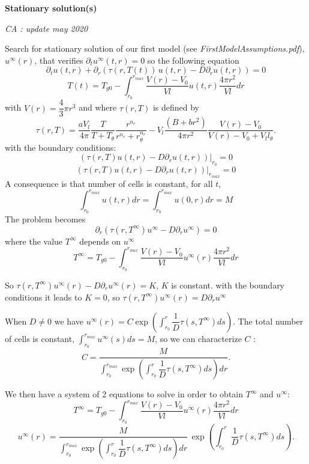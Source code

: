 \documentclass[11pt,a4paper]{article}
\newcommand{\CA}[1]{{\color{mypurple} \emph{CA : #1} }}
\begin{document}
\begin{center}
\large \textbf{Stationary solution(s)}
\end{center}
\CA{update may 2020}

Search for stationary solution of our first model (see \textit{FirstModelAssumptions.pdf}), $u^{\infty}(r)$, that verifies $\partial_t u^{\infty}(t, r) = 0$ so the following equation
$$\partial_t u(t, r) + \partial_r( \tau(r, T(t))\, u(t, r) - D \partial_r u(t,r)) = 0$$
$$T(t) = T_{g0} - \int_{r_0}^{r_{max}} \dfrac{V(r) - V_0}{Vl} u(t, r) \dfrac{4\pi r^2}{Vl} dr$$
with $V(r) = \dfrac{4}{3} \pi r^3$ and where $\tau(r, T)$ is defined by 
$$\tau(r, T) = \dfrac{aV_l}{4\pi}  \dfrac{T}{T + T_{\theta}} \dfrac{r^{n_r}}{r^{n_r}+ r_{\theta}^{n_r}} - V_l \dfrac{(B + br^2)}{4\pi r^2} \dfrac{V(r) - V_0}{V(r) - V_0 + V_l  l_{\theta}}.$$
with the boundary conditions:
$$(\tau(r, T) u(t,r) - D \partial_r u(t,r)) |_{r_{0}} = 0$$
$$(\tau(r, T) u(t,r) - D \partial_r u(t,r)) |_{r_{max}} = 0$$
A consequence is that number of cells is constant, for all $t$, $$ \displaystyle \int_{r_0}^{r_{max}} u(t, r) dr = \displaystyle \int_{r_0}^{r_{max}} u(0, r) dr = M $$ 
The problem becomes 
$$\partial_r( \tau(r, T^{\infty}) u^{\infty} - D \partial_r u^{\infty}) = 0$$
where the value $T^{\infty}$ depends on $u^{\infty}$
$$T^{\infty} = T_{g0} - \displaystyle \int_{r_0}^{r_{max}} \dfrac{V(r) - V_0}{Vl} u^{\infty}(r) \dfrac{4\pi r^2}{Vl} dr$$

So $\tau(r, T^{\infty}) u^{\infty}(r) - D \partial_r u^{\infty}(r) = K$, $K$ is constant.
with the boundary conditions it leads to $K = 0$, so $\tau(r, T^{\infty}) u^{\infty}(r) = D \partial_r u^{\infty}$

When $D \neq 0$ we have $u^{\infty}(r) = \displaystyle C \exp \left(\displaystyle  \int_{r_{0}}^{r} \dfrac{1}{D} \tau(s, T^{\infty}) ds \right)$.
The total number of cells is constant, $\displaystyle \int_{r_{0}}^{r_{max}} u^{\infty}(s) ds = M$, so we can characterize $C$ : 
$$ C = \displaystyle \dfrac{M}{\displaystyle \int_{r_{0}}^{r_{max}} \exp  \left( \int_{r_{0}}^{r} \dfrac{1}{D} \tau(s, T^{\infty}) ds \right) dr}.$$

We then have a system of 2 equations to solve in order to obtain $T^{\infty}$ and $u^{\infty}$: 
$$T^{\infty} = T_{g0} - \displaystyle  \int_{r_0}^{r_{max}} \dfrac{V(r) - V_0}{Vl} u^{\infty}(r) \dfrac{4\pi r^2}{Vl} dr$$
$$u^{\infty}(r) = \displaystyle \dfrac{M}{\displaystyle \int_{r_{0}}^{r_{max}} \exp  \left(\displaystyle  \int_{r_{0}}^{r} \dfrac{1}{D} \tau(s, T^{\infty}) ds \right) dr}  \, \exp \left(\displaystyle  \int_{r_{0}}^{r} \dfrac{1}{D} \tau(s, T^{\infty}) ds \right).$$
\end{document}
